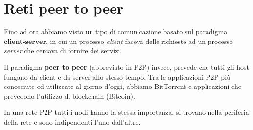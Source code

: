 \chapter{Reti peer to peer}
Fino ad ora abbiamo visto un tipo di comunicazione basato sul paradigma
\textbf{client-server}, in cui un processo \emph{client} faceva delle
richieste ad un processo \emph{server} che cercava di fornire dei
servizi.

Il paradigma \textbf{peer to peer} (abbreviato in P2P) invece, prevede 
che tutti gli host fungano da client e da server allo stesso tempo.
Tra le applicazioni P2P più conosciute ed utilizzate al giorno d'oggi,
abbiamo BitTorrent e applicazioni che prevedono l'utilizzo di 
blockchain (Bitcoin).

In una rete P2P tutti i nodi hanno la stessa importanza, si trovano
nella periferia della rete e sono indipendenti l'uno dall'altro.



